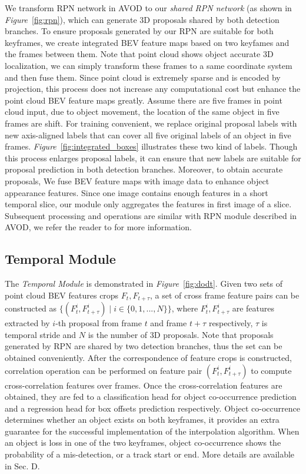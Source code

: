 \documentclass[a4paper, 10pt, conference]{ieeeconf}      %
\def\figurename{\emph{Figure}}
\begin{document}
We transform RPN network in AVOD \cite{ku2018joint} to our \textit{shared RPN network} (as shown in \figurename \, \ref{fig:rpn}), which can generate 3D proposals shared by both detection branches. To ensure proposals generated by our RPN are suitable for both keyframes, we create integrated BEV feature maps based on two keyfames and the frames between them. Note that point cloud shows object accurate 3D localization, we can simply transform these frames to a same coordinate system and then fuse them. Since point cloud is extremely sparse and is encoded by projection, this process does not increase any computational cost but enhance the point cloud BEV feature maps greatly. Assume there are five frames in point cloud input, due to object movement, the location of the same object in five frames are shift. For training convenient, we replace original proposal labels with new axis-aligned labels that can cover all five original labels of an object in five frames. \figurename \, \ref{fig:integrated_boxes} illustrates these two kind of labels. Though this process enlarges proposal labels, it can ensure that new labels are suitable for proposal prediction in both detection branches. Moreover, to obtain accurate proposals, We fuse BEV feature maps with image data to enhance object appearance features. Since one image contains enough features in a short temporal slice, our module only aggregates the features in first image of a slice. Subsequent processing and operations are similar with RPN module described in AVOD, we refer the reader to \cite{ku2018joint} for more information.

\subsection{Temporal Module}
The \textit{Temporal Module} is demonstrated in \figurename \, \ref{fig:dodt}. Given two sets of point cloud BEV features crops $F_t, F_{t+\tau}$, a set of cross frame feature pairs can be constructed as $\{(F_t^i, F_{t+\tau}^i)\mid i \in \{0,1,...,N\}\}$, where $F_t^i, F_{t+\tau}^i$ are features extracted by $i$-th proposal from frame $t$ and frame $t+\tau$ respectively, $\tau$ is temporal stride and $N$ is the number of 3D proposals. Note that proposals generated by RPN are shared by two detection branches, thus the set can be obtained conveniently. After the correspondence of feature crops is constructed, correlation operation can be performed on feature pair $(F_t^i, F_{t+\tau}^i)$ to compute cross-correlation features over frames. Once the cross-correlation features are obtained, they are fed to a classification head for object co-occurrence prediction and a regression head for box offsets prediction respectively. Object co-occurrence determines whether an object exists on both keyframes, it provides an extra guarantee for the successful implementation of the interpolation algorithm. When an object is loss in one of the two keyframes, object co-occurrence shows the probability of a mis-detection, or a track start or end. More details are available in Sec. D.
\end{document}

